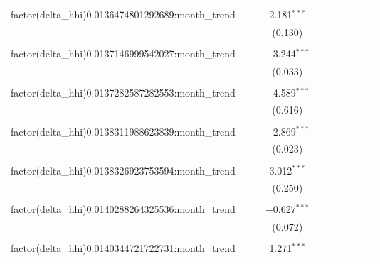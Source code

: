\begin{table}[H]
{\begin{tabular}{@{\extracolsep{5pt}}lccccccccc}
  factor(delta\_hhi)0.0136474801292689:month\_trend &  &  & 2.181$^{***}$ &  &  &  &  &  &  \\  

   &  &  & (0.130) &  &  &  &  &  &  \\  

   & & & & & & & & & \\  

  factor(delta\_hhi)0.0137146999542027:month\_trend &  &  & $-$3.244$^{***}$ &  &  &  &  &  &  \\  

   &  &  & (0.033) &  &  &  &  &  &  \\  

   & & & & & & & & & \\  

  factor(delta\_hhi)0.0137282587282553:month\_trend &  &  & $-$4.589$^{***}$ &  &  &  &  &  &  \\  

   &  &  & (0.616) &  &  &  &  &  &  \\  

   & & & & & & & & & \\  

  factor(delta\_hhi)0.0138311988623839:month\_trend &  &  & $-$2.869$^{***}$ &  &  &  &  &  &  \\  

   &  &  & (0.023) &  &  &  &  &  &  \\  

   & & & & & & & & & \\  

  factor(delta\_hhi)0.0138326923753594:month\_trend &  &  & 3.012$^{***}$ &  &  &  &  &  &  \\  

   &  &  & (0.250) &  &  &  &  &  &  \\  

   & & & & & & & & & \\  

  factor(delta\_hhi)0.0140288264325536:month\_trend &  &  & $-$0.627$^{***}$ &  &  &  &  &  &  \\  

   &  &  & (0.072) &  &  &  &  &  &  \\  

   & & & & & & & & & \\  

  factor(delta\_hhi)0.0140344721722731:month\_trend &  &  & 1.271$^{***}$ &  &  &  &  &  &  \\  


\end{tabular}}
\end{table}
